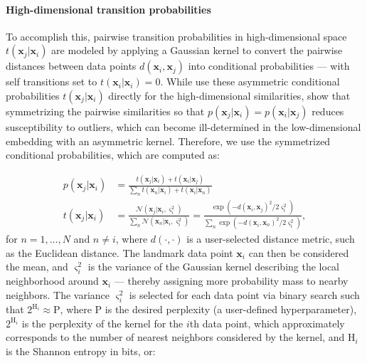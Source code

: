 \paragraph{High-dimensional transition probabilities} To accomplish this, pairwise transition probabilities in high-dimensional space $t(\mathbf{x}_j | \mathbf{x}_i)$ are modeled by applying a Gaussian kernel to convert the pairwise distances between data points $d(\mathbf{x}_i, \mathbf{x}_j)$ into conditional probabilities --- with self transitions set to $t(\mathbf{x}_i | \mathbf{x}_i) = 0$. While \cite{ding2018scvis} use these asymmetric conditional probabilities $t(\mathbf{x}_j | \mathbf{x}_i)$ directly for the high-dimensional similarities, \cite{maaten2008tsne} show that symmetrizing the pairwise similarities so that $p(\mathbf{x}_j | \mathbf{x}_i) = p(\mathbf{x}_i | \mathbf{x}_j)$ reduces susceptibility to outliers, which can become ill-determined in the low-dimensional embedding with an asymmetric kernel. Therefore, we use the symmetrized conditional probabilities, which are computed as:

\begin{subequations}
    \begin{align}
    p(\mathbf{x}_j | \mathbf{x}_i) &= \frac{t(\mathbf{x}_j | \mathbf{x}_i) + t(\mathbf{x}_i | \mathbf{x}_j)}{\sum_{n} t(\mathbf{x}_n | \mathbf{x}_i) + t(\mathbf{x}_i | \mathbf{x}_n)} \label{eq:highd_sim}\\
    t(\mathbf{x}_j | \mathbf{x}_i) &= \frac{\mathcal{N}(\mathbf{x}_j | \mathbf{x}_i, \varsigma_i^{2})}{\sum_{n} \mathcal{N}(\mathbf{x}_n | \mathbf{x}_i, \varsigma_i^{2})} = \frac{\exp \left(-d(\mathbf{x}_i, \mathbf{x}_j)^2 / 2 \varsigma_i^{2}\right)}{\sum_{n} \exp \left(-d(\mathbf{x}_i, \mathbf{x}_n)^2 / 2 \varsigma_i^{2}\right)} \label{eq:transition},
    \end{align}
\end{subequations}
for $n = 1, \dots ,N$ and $n \neq i$, where $d(\cdot, \cdot)$ is a user-selected distance metric, such as the Euclidean distance. The landmark data point $\mathbf{x}_i$ can then be considered the mean, and $\varsigma_i^{2}$ is the variance of the Gaussian kernel describing the local neighborhood around $\mathbf{x}_i$ --- thereby assigning more probability mass to nearby neighbors. 
The variance $\varsigma_i^{2}$ is selected for each data point via binary search such that $2^{\mathrm{H}_i} \approx \mathrm{P}$, where $\mathrm{P}$ is the desired perplexity (a user-defined hyperparameter), $2^{\mathrm{H}_i}$ is the perplexity of the kernel for the $i$th data point, which approximately corresponds to the number of nearest neighbors considered by the kernel, and $\mathrm{H}_i$ is the Shannon entropy in bits, or:

